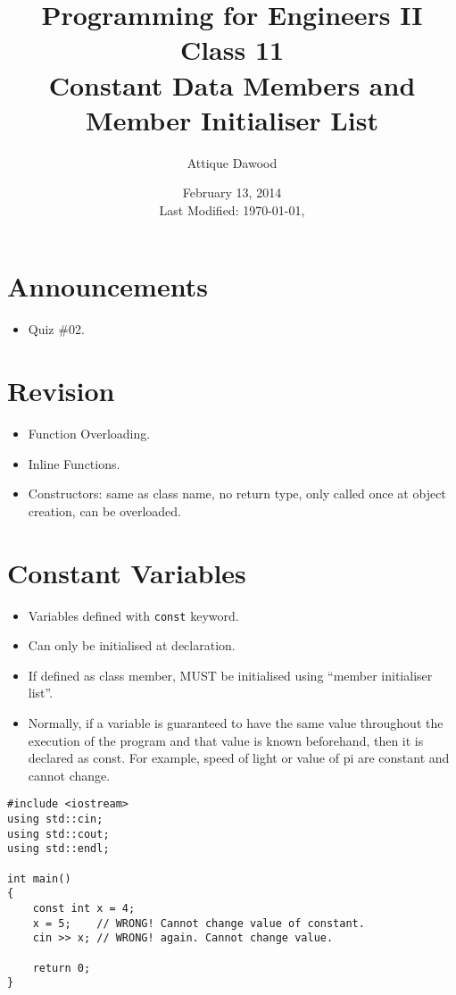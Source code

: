 \documentclass[12pt,a4paper]{article}
\title{\vspace{-2cm}Programming for Engineers II\\Class 11\\Constant Data Members and Member Initialiser List}
\author{Attique Dawood}
\date{February 13, 2014\\[0.2cm] Last Modified: \today, \currenttime}
\begin{document}
\maketitle
\section{Announcements}
\begin{itemize}
\item Quiz \#02.
\end{itemize}
\section{Revision}
\begin{itemize}
\item Function Overloading.
\item Inline Functions.
\item Constructors: same as class name, no return type, only called once at object creation, can be overloaded.
\end{itemize}
\section{Constant Variables}
\begin{itemize}
\item Variables defined with \verb|const| keyword.
\item Can only be initialised at declaration.
\item If defined as class member, MUST be initialised using ``member initialiser list''.
\item Normally, if a variable is guaranteed to have the same value throughout the execution of the program and that value is known beforehand, then it is declared as const. For example, speed of light or value of pi are constant and cannot change.
\end{itemize}
\begin{lstlisting}[caption={const variable}]
#include <iostream>
using std::cin;
using std::cout;
using std::endl;

int main()
{
	const int x = 4;
	x = 5;    // WRONG! Cannot change value of constant.
	cin >> x; // WRONG! again. Cannot change value.
	
	return 0;
}
\end{lstlisting}
\end{document}
